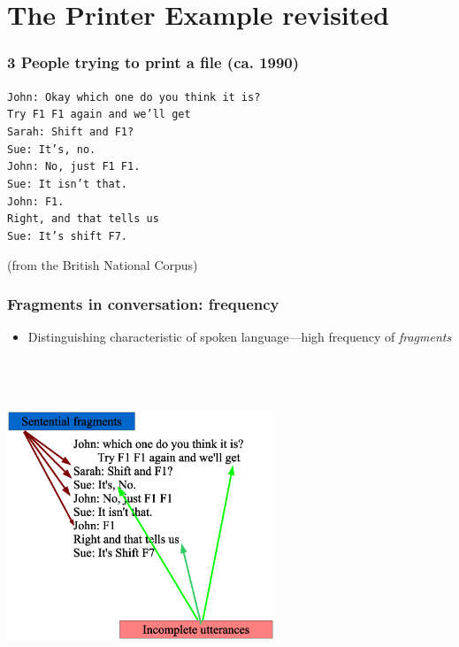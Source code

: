 \documentclass{beamer}
\newcommand{\bit}{\begin{itemize}}
\newcommand{\eit}{\end{itemize}}
\begin{document}
{\section{The Printer Example revisited}

\begin{frame}\frametitle{3 People trying to print a file
    (ca. 1990)} 

{\tt John:	Okay which one do you think it is?\\
\hspace{1cm}	Try F1 F1  again and we'll get \\
Sarah:	Shift and F1?  \\
Sue:	It's,  no. \\
John:	No, just F1  F1. \\
Sue:	It isn't that. \\
John:	F1. \\
	Right, and that tells us \\
Sue:	It's shift F7.} 

\hspace{1in} (from the British National Corpus)

\end{frame}

\begin{frame}[label=runningex1]\frametitle{Fragments in conversation: frequency}

\bit
\item Distinguishing characteristic of spoken language---high
  frequency of {\it fragments}
\eit
\includegraphics[height=10cm,width=8cm]{challenges0.eps}


\end{frame}}
\end{document}
